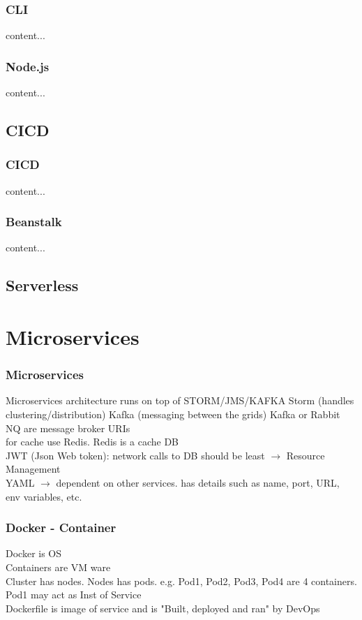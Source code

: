 \documentclass{beamer}
\begin{document}
\begin{frame}\frametitle{CLI}
content...
\end{frame}

\begin{frame}\frametitle{Node.js}
content...
\end{frame}


\subsection{CICD}
\begin{frame}\frametitle{CICD}
content...
\end{frame}

\begin{frame}\frametitle{Beanstalk}
content...
\end{frame}



\subsection{Serverless}






\section{Microservices}

\begin{frame}
	\frametitle{Microservices}
	Microservices architecture runs on top of STORM/JMS/KAFKA \newline
	Storm (handles clustering/distribution) \newline
	Kafka (messaging between the grids) \newline
	Kafka or Rabbit NQ are message broker URIs\\
	for cache use Redis. Redis is a cache DB\\
	JWT (Json Web token): network calls to DB should be least $\rightarrow$ Resource Management\\
	YAML $\rightarrow$ dependent on other services. has details such as name, port, URL, env variables, etc.
\end{frame}


\begin{frame}\frametitle{Docker - Container}
	Docker is OS\\
	Containers are VM ware\\
	Cluster has nodes. Nodes has pods. e.g. Pod1, Pod2, Pod3, Pod4 are 4 containers. Pod1 may act as Inst of Service\\
	Dockerfile is image of service and is "Built, deployed and ran" by DevOps\\
\end{frame}
\end{document}
